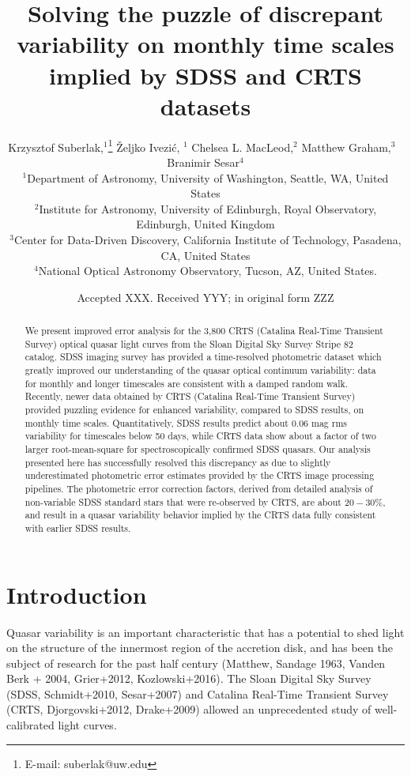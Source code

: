 \documentclass[fleqn,usenatbib]{mnras}  %
\title[Quasar Variability]{Solving the puzzle of discrepant variability on monthly time scales implied by SDSS and CRTS datasets}
\author[K. Suberlak et al.]{
Krzysztof Suberlak,$^{1}$\thanks{E-mail: suberlak@uw.edu}
\v{Z}eljko Ivezi\'c, $^{1}$
Chelsea L. MacLeod,$^{2}$
Matthew Graham,$^{3}$ 
\newauthor
$\, \,  $Branimir Sesar$^{4}$
\\
$^{1}$Department of Astronomy, University of Washington, Seattle, WA, United States\\
$^{2}$Institute for Astronomy, University of Edinburgh, Royal Observatory, Edinburgh, United Kingdom\\
$^{3}$Center for Data-Driven Discovery, California Institute of Technology, Pasadena, CA, United States\\
$^{4}$National Optical Astronomy Observatory, Tucson, AZ, United States.
}
\date{Accepted XXX. Received YYY; in original form ZZZ}
\begin{document}
\label{firstpage}
\pagerange{\pageref{firstpage}--\pageref{lastpage}}
\maketitle

\begin{abstract}

We present improved error analysis for the 3,800 CRTS (Catalina Real-Time Transient Survey) optical quasar light curves from the Sloan Digital Sky Survey Stripe 82 catalog. SDSS imaging survey has provided a time-resolved photometric  dataset which greatly improved our understanding of the quasar optical continuum variability: data for monthly and longer timescales  are consistent with a damped random walk. Recently, newer data  obtained by CRTS (Catalina Real-Time Transient Survey) provided  puzzling evidence for enhanced variability, compared to SDSS results, on monthly time scales. Quantitatively, SDSS results predict  about $0.06$ mag rms variability for timescales below 50 days, while CRTS data show about a factor of two larger root-mean-square  for spectroscopically confirmed SDSS quasars. Our analysis presented here has successfully resolved this discrepancy as due to slightly underestimated photometric error estimates provided by the CRTS image processing pipelines. The photometric error correction factors, derived from detailed analysis of non-variable SDSS standard stars that were re-observed by CRTS, are about $20-30\%$, and result in a quasar variability behavior implied by the CRTS data fully consistent with earlier SDSS results.


\end{abstract}




\section{Introduction}
\label{sec:intro}

Quasar variability is an important characteristic that has a potential to shed light on the structure of the innermost region of the accretion disk, and has been the subject of research for the past half century (Matthew, Sandage 1963, Vanden Berk + 2004, Grier+2012, Kozlowski+2016). The Sloan Digital Sky Survey (SDSS, Schmidt+2010, Sesar+2007) and Catalina Real-Time Transient Survey (CRTS, Djorgovski+2012, Drake+2009) allowed an unprecedented study of well-calibrated light curves. 
\end{document}
